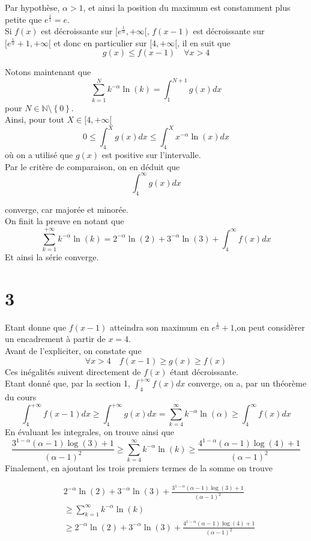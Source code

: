 \documentclass[11pt, a4paper]{article}
\begin{document}
Par hypothèse, $\alpha>1$, et ainsi la position du maximum est constamment plus petite que $e^{\frac{1}{1}}=e$.\\
Si $f( x) $ est décroissante sur $[e^{\frac{1}{\alpha}}, + \infty [ $, $f( x-1) $ est décroissante sur $[e^{\frac{1}{\alpha}}+1, + \infty [ $ et donc en particulier sur $[4, + \infty[ $, il en suit que
\[ 
	g( x) \leq f( x-1) \quad \forall x > 4 
\]


Notons maintenant que
\[ 
	\sum_{k=1}^{ N } k^{-\alpha}\ln( k) = \int_{ 1 }^{ N+1  } g( x) dx
\]
pour $N \in \mathbb{N}\setminus \left\{ 0 \right\} $.\\
Ainsi, pour tout $X \in [4, + \infty[$ 
\[ 
0 \leq	\int_{ 4 }^{ X }g( x) dx \leq \int_{ 4 }^{ X }x^{-\alpha}\ln( x) dx 
\]
où on a utilisé que $g( x) $ est positive sur l'intervalle.\\
Par le critère de comparaison, on en déduit que
\[ 
	\int_{ 4 }^{ \infty  } g( x) dx 
\]

converge, car majorée et minorée.\\
On finit la preuve en notant que
\[ 
	\sum_{k=1}^{ + \infty } k^{-\alpha}\ln( k) = 2^{-\alpha}\ln( 2) + 3^{-\alpha}\ln( 3) +\int_{ 4 }^{ \infty  }f( x) dx
\]
Et ainsi la série converge.
\section*{3}
Etant donne que $f( x-1) $ atteindra son maximum en $e^{\frac{1}{\alpha}}+1$,on peut considèrer un encadrement à partir de $x=4$.\\
Avant de l'expliciter, on constate que
\[ 
	\forall x>4\quad f( x-1) \geq g( x) \geq f(x) 
\]
Ces inégalités suivent directement de $f( x)  $ étant décroissante.\\

Etant donné que, par la section 1, $ \int_{ 4 }^{ + \infty  }f( x) dx$ converge, on a, par un théorème du cours
\[ 
	\int_{ 4 }^{ + \infty  } f( x-1) dx \geq \int_{ 4 }^{ + \infty  }g( x) dx = \sum_{k=4}^{ \infty } k^{-\alpha} \ln( \alpha) \geq \int_{ 4 }^{ \infty  }f( x) dx
\]
En évaluant les integrales, on trouve ainsi que
\[ 
	\frac{3^{1-\alpha}( \alpha-1) \log( 3) +1}{( \alpha-1) ^{2}} \geq\sum_{k=4}^{ \infty } k^{-\alpha} \ln( k)\geq \frac{4^{1-\alpha}( \alpha-1) \log( 4) +1}{( \alpha-1) ^{2}} 
\]
Finalement, en ajoutant les trois premiers termes de la somme on trouve

\begin{align*}
	&2^{-\alpha}\ln( 2) + 3^{-\alpha}\ln( 3)  + \frac{3^{1-\alpha}( \alpha-1) \log( 3) +1}{( \alpha-1) ^{2}}\\
	&\geq\sum_{k=1}^{ \infty } k^{-\alpha} \ln( k)\\
	&\geq 2^{-\alpha}\ln( 2)+ 3^{-\alpha}\ln( 3) +\frac{4^{1-\alpha}( \alpha-1) \log( 4) +1}{( \alpha-1) ^{2}} 
\end{align*}
\end{document}
